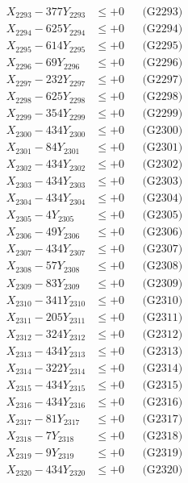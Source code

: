 \documentclass[a4paper,10pt]{article}
\begin{document}
{\begin{align}
X_{2293} - 377Y_{2293} &\leq +0 && \text{(G2293)} \\
X_{2294} - 625Y_{2294} &\leq +0 && \text{(G2294)} \\
X_{2295} - 614Y_{2295} &\leq +0 && \text{(G2295)} \\
X_{2296} - 69Y_{2296} &\leq +0 && \text{(G2296)} \\
X_{2297} - 232Y_{2297} &\leq +0 && \text{(G2297)} \\
X_{2298} - 625Y_{2298} &\leq +0 && \text{(G2298)} \\
X_{2299} - 354Y_{2299} &\leq +0 && \text{(G2299)} \\
X_{2300} - 434Y_{2300} &\leq +0 && \text{(G2300)} \\
\allowbreak
X_{2301} - 84Y_{2301} &\leq +0 && \text{(G2301)} \\
X_{2302} - 434Y_{2302} &\leq +0 && \text{(G2302)} \\
X_{2303} - 434Y_{2303} &\leq +0 && \text{(G2303)} \\
X_{2304} - 434Y_{2304} &\leq +0 && \text{(G2304)} \\
X_{2305} - 4Y_{2305} &\leq +0 && \text{(G2305)} \\
X_{2306} - 49Y_{2306} &\leq +0 && \text{(G2306)} \\
X_{2307} - 434Y_{2307} &\leq +0 && \text{(G2307)} \\
X_{2308} - 57Y_{2308} &\leq +0 && \text{(G2308)} \\
X_{2309} - 83Y_{2309} &\leq +0 && \text{(G2309)} \\
X_{2310} - 341Y_{2310} &\leq +0 && \text{(G2310)} \\
\allowbreak
X_{2311} - 205Y_{2311} &\leq +0 && \text{(G2311)} \\
X_{2312} - 324Y_{2312} &\leq +0 && \text{(G2312)} \\
X_{2313} - 434Y_{2313} &\leq +0 && \text{(G2313)} \\
X_{2314} - 322Y_{2314} &\leq +0 && \text{(G2314)} \\
X_{2315} - 434Y_{2315} &\leq +0 && \text{(G2315)} \\
X_{2316} - 434Y_{2316} &\leq +0 && \text{(G2316)} \\
X_{2317} - 81Y_{2317} &\leq +0 && \text{(G2317)} \\
X_{2318} - 7Y_{2318} &\leq +0 && \text{(G2318)} \\
X_{2319} - 9Y_{2319} &\leq +0 && \text{(G2319)} \\
X_{2320} - 434Y_{2320} &\leq +0 && \text{(G2320)} \\

\end{align}}
\end{document}
